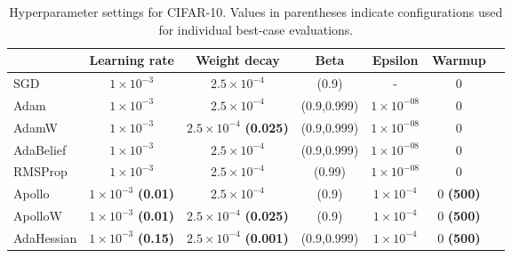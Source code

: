 \begin{table}[h!]
    \centering
    \caption{Hyperparameter settings for CIFAR-10. Values in parentheses indicate configurations used for individual best-case evaluations. }
    \label{tab:cifar-real-comp}
    \begin{tabular}{lcccccc}  %
        \toprule
        & \textbf{Learning rate} & \textbf{Weight decay} & \textbf{Beta} & \textbf{Epsilon} & \textbf{Warmup}  \\
        \midrule
        SGD         & $1 \times 10^{-3}$ & $2.5 \times 10 ^{-4} $ & (0.9) & - & 0  \\
        Adam        & $1 \times 10^{-3}$ & $2.5 \times 10 ^{-4} $ & (0.9,0.999) & $1 \times 10^{-08}$ & 0     \\
        AdamW       & $1 \times 10^{-3}$ & $2.5 \times 10 ^{-4} $ \textbf{(0.025)} & (0.9,0.999) & $1 \times 10^{-08}$ & 0 \\
        AdaBelief   & $1 \times 10^{-3}$ & $2.5 \times 10 ^{-4} $ & (0.9,0.999) & $1 \times 10^{-08}$ & 0  \\
        RMSProp     & $1 \times 10^{-3}$ & $2.5 \times 10 ^{-4} $ & (0.99) & $1 \times 10^{-08}$ & 0 \\
        Apollo      & $1 \times 10^{-3}$ \textbf{(0.01)} & $2.5 \times 10 ^{-4}$ & (0.9) & $1 \times 10 ^{-4} $ & 0 \textbf{(500)}\\
        ApolloW     & $1 \times 10^{-3}$ \textbf{(0.01)} & $2.5 \times 10 ^{-4} $ \textbf{(0.025)} & (0.9) & $1 \times 10 ^{-4} $ & 0 \textbf{(500)}  \\
        AdaHessian  & $1 \times 10^{-3}$ \textbf{(0.15)} & $2.5 \times 10 ^{-4}$  \textbf{(0.001)} & (0.9,0.999) &$1 \times 10 ^{-4} $& 0 \textbf{(500)} \\
        \bottomrule
    \end{tabular}
\end{table}

